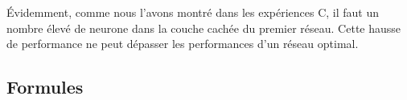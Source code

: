   Évidemment, comme nous l'avons montré dans les expériences C, il faut un nombre élevé de neurone dans la couche cachée du premier réseau.
  Cette hausse de performance ne peut dépasser les performances d'un réseau optimal.
 
  \newpage 
  \subsection{Formules}
    
    
    
    


